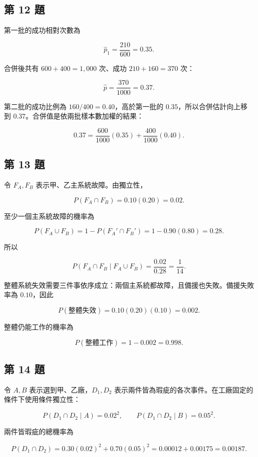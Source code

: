 \documentclass[11pt,a4paper]{article}
\begin{document}
\subsection{第 12 題}\label{ux7b2c-12-ux984c}

第一批的成功相對次數為

\[
\hat p_1=\frac{210}{600}=\boxed{0.35}.
\]

合併後共有 \(600+400=1{,}000\) 次、成功 \(210+160=370\) 次：

\[
\hat p=\frac{370}{1000}=\boxed{0.37}.
\]

第二批的成功比例為 \(160/400=0.40\)，高於第一批的 \(0.35\)，所以合併估計向上移到 \(0.37\)。合併值是依兩批樣本數加權的結果：

\[
0.37=\frac{600}{1000}(0.35)+\frac{400}{1000}(0.40).
\]

\subsection{第 13 題}\label{ux7b2c-13-ux984c}

令 \(F_A,F_B\) 表示甲、乙主系統故障。由獨立性，

\[
P(F_A\cap F_B)=0.10(0.20)=0.02.
\]

至少一個主系統故障的機率為

\[
P(F_A\cup F_B)=1-P(F_A'\cap F_B')
=1-0.90(0.80)=0.28.
\]

所以

\[
P(F_A\cap F_B\mid F_A\cup F_B)
=\frac{0.02}{0.28}
=\boxed{\frac1{14}}.
\]

整體系統失效需要三件事依序成立：兩個主系統都故障，且備援也失敗。備援失敗率為 \(0.10\)，因此

\[
P(\text{整體失效})=0.10(0.20)(0.10)=0.002.
\]

整體仍能工作的機率為

\[
P(\text{整體工作})=1-0.002=\boxed{0.998}.
\]

\subsection{第 14 題}\label{ux7b2c-14-ux984c}

令 \(A,B\) 表示選到甲、乙廠，\(D_1,D_2\) 表示兩件皆為瑕疵的各次事件。在工廠固定的條件下使用條件獨立性：

\[
P(D_1\cap D_2\mid A)=0.02^2,
\qquad
P(D_1\cap D_2\mid B)=0.05^2.
\]

兩件皆瑕疵的總機率為

\[
P(D_1\cap D_2)
=0.30(0.02)^2+0.70(0.05)^2
=0.00012+0.00175
=0.00187.
\]
\end{document}
